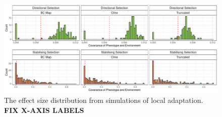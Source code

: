 \documentclass[10pt,twoside,lineno, twocolumn]{GSA_format}
\begin{document}
\pagebreak


\begin{figure}[H]
  \includegraphics[width=\textwidth,height=0.75\textheight,keepaspectratio]{Plots/effectSizeDistributionPlot.pdf}
  \caption{The effect size distribution from simulations of local adaptation. \textbf{FIX X-AXIS LABELS}}

  \label{fig:effectSizeDistribution}
\end{figure}
\pagebreak
\end{document}
